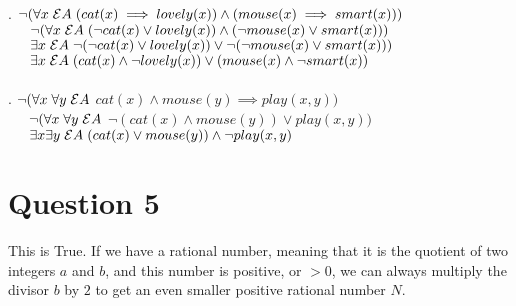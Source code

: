 \documentclass{article}
\begin{document}
    . $\neg(\forall x \hspace{0.1cm} \mathcal{E} A  \hspace{0.1cm} (cat(x) \implies lovely(x)) \land (mouse(x) \implies smart(x)))   $ \\
    $\indent \neg(\forall x \hspace{0.1cm} \mathcal{E} A  \hspace{0.1cm} (\neg cat(x) \lor lovely(x)) \land (\neg mouse(x) \lor smart(x)))$\\
    $\indent \exists x  \hspace{0.1cm}  \mathcal{E} A  \hspace{0.1cm} \neg (\neg cat(x) \lor lovely(x)) \lor \neg (\neg mouse(x) \lor smart(x)))$ \\
    $\indent \exists x  \hspace{0.1cm} \mathcal{E} A  \hspace{0.1cm} (cat(x) \land \neg lovely(x)) \lor (mouse(x) \land \neg smart(x))$ \\ \\
    
    . $\neg(\forall x \hspace{0.1cm} \forall y \hspace{0.1cm} \mathcal{E} A$
    $cat(x) \land mouse(y) \implies {play(x,y))}$ \\
    $\indent\neg(\forall x \hspace{0.1cm} \forall y \hspace{0.1cm} \mathcal{E} A$
    $\neg(cat(x) \land mouse(y)) \lor play(x,y))$ \\
    $\indent \exists x \exists y  \hspace{0.1cm} \mathcal{E} A  \hspace{0.1cm} (cat(x) \lor mouse(y)) \land \neg play(x,y)$ \\
  

    \newpage
    \section*{Question 5}
    This is True. If we have a rational number, meaning that it is the quotient of two integers $a$ and $b$, and this number is positive, or $>0$, we can always multiply the divisor $b$ by $2$ to get an even smaller positive rational number $N$.
   
   

   
\end{document}
